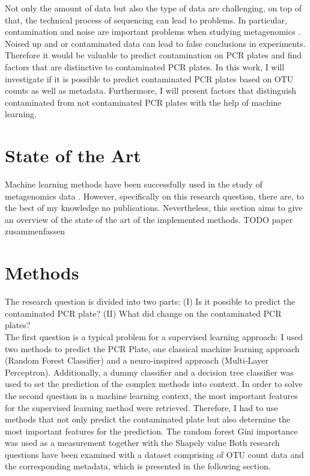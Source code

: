 \documentclass{svproc}
\begin{document}
Not only the amount of data but also the type of data are challenging, on top of that, the technical process of sequencing can lead to problems.
In particular, contamination and noise are important problems when studying metagenomics \cite{eisenhofer2019contamination}. Noised up and or contaminated data can lead to false conclusions in experiments. Therefore it would be valuable to predict contamination on PCR plates and find factors that are distinctive to contaminated PCR plates. In this work, I will investigate if it is possible to predict contaminated PCR plates based on OTU counts as well as metadata. Furthermore, I will present factors that distinguish contaminated from not contaminated PCR plates with the help of machine learning.


\section{State of the Art}
Machine learning methods have been successfully used in the study of metagenomics data  \cite{Soueidan2017}. However, specifically on this research question, there are, to the best of my knowledge no publications. Nevertheless, this section aims to give an overview of the state of the art of the implemented methods. TODO paper zusammenfassen

%
%
\section{Methods}

The research question is divided into two parts: (I) Is it possible to predict the contaminated PCR plate? (II) What did change on the contaminated PCR plates? \\
The first question is a typical problem for a supervised learning approach: I used two methods to predict the PCR Plate, one classical machine learning approach (Random Forest Classifier) and a neuro-inspired approach (Multi-Layer Perceptron).  Additionally, a dummy classifier and a decision tree classifier was used to set the prediction of the complex methods into context.
In order to solve the second question in a machine learning context, the most important features for the supervised learning method were retrieved. Therefore, I had to use methods that not only predict the contaminated plate but also determine the most important features for the prediction. The random forest Gini importance was used as a measurement together with the Shapely value
Both research questions have been examined with a dataset comprising of OTU count data and the corresponding metadata, which is presented in the following section.
\end{document}
